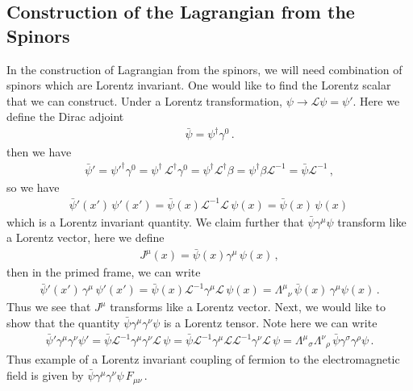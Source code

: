 \documentclass[11pt, onesided]{book}
\theoremstyle{break}
\theoremstyle{break}
\begin{document}
\subsection{Construction of the Lagrangian from the Spinors}
In the construction of Lagrangian from the spinors, we will need combination of spinors which are Lorentz invariant. One would like to find the Lorentz scalar that we can construct. Under a Lorentz transformation, $\psi	\to \mathcal{L}\psi = \psi'$. Here we define the Dirac adjoint
\begin{align*}
\bar{\psi} = \psi^{\dagger}\gamma^0 \,.
\end{align*}
then we have
\begin{align*}
\bar{\psi}' ={\psi'}^{\dagger} \gamma^0 = \psi^\dagger \, \mathcal{L}^\dagger \gamma^0 = \psi^\dagger \mathcal{L}^\dagger \beta = \psi^\dagger \beta \mathcal{L}^{-1} = \bar{\psi}\mathcal{L}^{-1}\,,
\end{align*}
so we have
\begin{align*}
\bar{\psi}'(x') \, \psi'(x') = \bar{\psi}(x) \mathcal{L}^{-1}\mathcal{L}\, \psi(x) = \bar{\psi}(x) \, \psi(x)\,
\end{align*}
which is a Lorentz invariant quantity. We claim further that $\bar{\psi}\gamma^\mu \psi$ transform like a Lorentz vector, here we define
\begin{align*}
J^\mu(x) = \bar{\psi}(x) \gamma^\mu \, \psi(x) \,,
\end{align*}
then in the primed frame, we can write
\begin{align*}
\bar{\psi}'(x') \, \gamma^\mu \,\psi'(x') =\bar{\psi}(x) \mathcal{L}^{-1} \gamma^\mu \mathcal{L}\, \psi(x) =\Lambda^\mu{}_\nu \,\bar{\psi}(x) \, \gamma^\mu \psi(x)\,.
\end{align*}
Thus we see that $J^\mu$ transforms like a Lorentz vector. Next, we would like to show that the quantity $\bar{\psi}\gamma^\mu \gamma^\nu \psi$
is a Lorentz tensor. Note here we can write
\begin{align*}
\bar{\psi}' \gamma^\mu \gamma^\nu \psi' = \bar{\psi} \mathcal{L}^{-1} \gamma^\mu \gamma^\nu \mathcal{L}\, \psi=  \bar{\psi} \mathcal{L}^{-1} \gamma^\mu \mathcal{L}\mathcal{L}^{-1 }\gamma^\nu \mathcal{L}\, \psi = \Lambda^{\mu}{}_\sigma\Lambda^\nu{}_{\rho}\,\bar{\psi} \gamma^\sigma\gamma^\rho \psi\,.
\end{align*}
Thus example of a Lorentz invariant coupling of fermion to the electromagnetic field is given by $\bar{\psi} \gamma^{\mu}\gamma^{\nu}\psi\, F_{\mu\nu}\,.$\\
\end{document}
